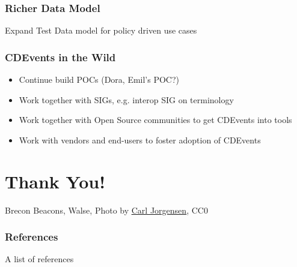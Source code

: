 \documentclass[aspectratio=169,11pt,hyperref={colorlinks=true}]{beamer}
\begin{document}
\begin{lgrayrwhiteframe}
  \frametitle{Richer Data Model}
  Expand Test Data model for policy driven use cases
\end{lgrayrwhiteframe}

\begin{lgrayrwhiteframe}
  \frametitle{CDEvents in the Wild}
  \begin{itemize}
    \item Continue build POCs (Dora, Emil's POC?)
    \item Work together with SIGs, e.g. interop SIG on terminology
    \item Work together with Open Source communities to get CDEvents into tools
    \item Work with vendors and end-users to foster adoption of CDEvents
  \end{itemize}
\end{lgrayrwhiteframe}

\section[Thank You]{Thank You!}

\begin{sectionwithpiclargecentral}{Brecon Beacons, Walse, Photo by \href{https://unsplash.com/@scamartist}{\underline{Carl Jorgensen}}, CC0}
\end{sectionwithpiclargecentral}

\begin{blackframe}
  \frametitle{References}
  A list of references
\end{blackframe}
\end{document}
